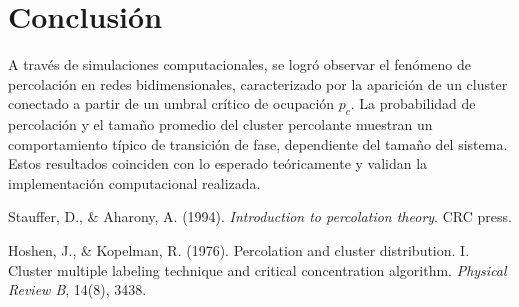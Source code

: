 \documentclass[10pt,twocolumn]{article}
\begin{document}
\section{Conclusión}
   A través de simulaciones computacionales, se logró observar el fenómeno de percolación en redes bidimensionales, caracterizado por la aparición de un cluster conectado a partir de un umbral crítico de ocupación \( p_c \). La probabilidad de percolación y el tamaño promedio del cluster percolante muestran un comportamiento típico de transición de fase, dependiente del tamaño del sistema. Estos resultados coinciden con lo esperado teóricamente y validan la implementación computacional realizada.
    
\begin{thebibliography}{99}

Stauffer, D., \& Aharony, A. (1994). \textit{Introduction to percolation theory}. CRC press.

Hoshen, J., \& Kopelman, R. (1976). Percolation and cluster distribution. I. Cluster multiple labeling technique and critical 
concentration algorithm. \textit{Physical Review B}, 14(8), 3438.

\end{thebibliography}
\end{document}
